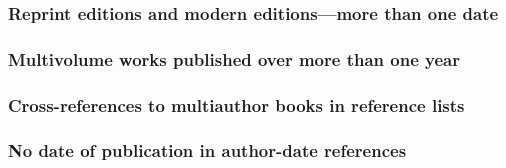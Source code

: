 \documentclass[11pt,letterpaper,oneside]{article}
\begin{document}
\setcounter{subsubsection}{39}
\subsubsection{Reprint editions and modern editions—more than one date}

\begin{citeref}
\item \parencite{austen2003}
\item \parencite{maitland1998}
\end{citeref}

\subsubsection{Multivolume works published over more than one year}
\label{15.41}

\begin{citeref}
\item \parencite[1:133]{tillich1951}
\item \parencite[329]{hayek2011}
\end{citeref}

\subsubsection{Cross-references to multiauthor books in reference lists}

\begin{citeref}
\item \parencite{draper1987}
\item \parencite{harrington1987}
\item \parencite{zukowsky1987}
\end{citeref}

\setcounter{subsubsection}{43}
\subsubsection{No date of publication in author-date references}

\begin{citeref}
\item \parencite{nano1750}
\item \parencite{nano}
\end{citeref}
\end{document}
